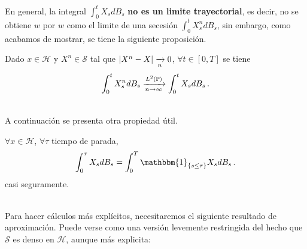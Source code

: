 \begin{remark}
    En general, la integral $\int_{0}^{t}X_s dB_s$ \textbf{no es un limite trayectorial}, es decir, no se obtiene $w$ por $w$ como el limite de una secesión $\int_{0}^{t} X_s^n dB_s$, sin embargo, como acabamos de mostrar, se tiene la siguiente proposición.
\end{remark}
\begin{proposition}
    Dado $x \in \mathcal{H}$ y $X^n \in \mathcal{S}$ tal que $\abs{X^n - X} \xrightarrow[n]{} 0$, $\forall t \in [0,T]$ se tiene 
    \begin{equation*}
        \int_{0}^{t} X_s^n dB_s \xrightarrow[n \to \infty]{L^2(\P)} \int_{0}^{t}X_s dB_s\,.
    \end{equation*}
\end{proposition}
\vspace{.75cm}\\
A continuación se presenta otra propiedad útil.
\begin{proposition}
$\forall  x \in \mathcal{H}$, $\forall \tau$ tiempo de parada,
\begin{equation*}
    \int_{0}^{\tau} X_s dB_s = \int_{0}^{T} \mathbbm{1}_{\{s \le \tau \}} X_s dB_s\,.
\end{equation*}
casi seguramente.
\end{proposition}
\vspace{.75cm}\\
Para hacer cálculos más explícitos, necesitaremos el siguiente resultado de aproximación. Puede verse como una versión levemente restringida del hecho que $\mathcal{S}$ es denso en $\mathcal{H}$, aunque más explicita: 


